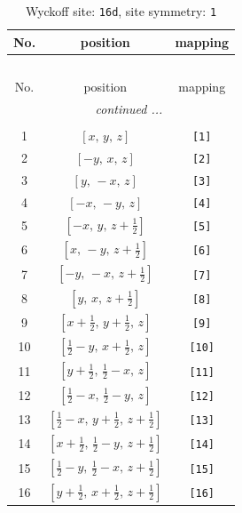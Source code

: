\documentclass[fleqn,8pt]{jsarticle}
\begin{document}
\begin{longtable}{ccc}
\caption{Wyckoff site: {\tt 16d}, site symmetry: {\tt 1}}
 \\
 \hline \hline
No. & position & mapping \\ \hline \endfirsthead

\multicolumn{2}{l}{\tablename\ \thetable{}} \\
 \hline \hline
No. & position & mapping \\ \hline \endhead

 \hline \hline
\multicolumn{2}{r}{\footnotesize\it continued ...} \\ \endfoot

 \hline \hline
\multicolumn{2}{r}{} \\ \endlastfoot

1 & $\left[ x,\, y,\, z \right]$ & {\tt [1]} \\ \hline
2 & $\left[ - y,\, x,\, z \right]$ & {\tt [2]} \\ \hline
3 & $\left[ y,\, - x,\, z \right]$ & {\tt [3]} \\ \hline
4 & $\left[ - x,\, - y,\, z \right]$ & {\tt [4]} \\ \hline
5 & $\left[ - x,\, y,\, z + \frac{1}{2} \right]$ & {\tt [5]} \\ \hline
6 & $\left[ x,\, - y,\, z + \frac{1}{2} \right]$ & {\tt [6]} \\ \hline
7 & $\left[ - y,\, - x,\, z + \frac{1}{2} \right]$ & {\tt [7]} \\ \hline
8 & $\left[ y,\, x,\, z + \frac{1}{2} \right]$ & {\tt [8]} \\ \hline
9 & $\left[ x + \frac{1}{2},\, y + \frac{1}{2},\, z \right]$ & {\tt [9]} \\ \hline
10 & $\left[ \frac{1}{2} - y,\, x + \frac{1}{2},\, z \right]$ & {\tt [10]} \\ \hline
11 & $\left[ y + \frac{1}{2},\, \frac{1}{2} - x,\, z \right]$ & {\tt [11]} \\ \hline
12 & $\left[ \frac{1}{2} - x,\, \frac{1}{2} - y,\, z \right]$ & {\tt [12]} \\ \hline
13 & $\left[ \frac{1}{2} - x,\, y + \frac{1}{2},\, z + \frac{1}{2} \right]$ & {\tt [13]} \\ \hline
14 & $\left[ x + \frac{1}{2},\, \frac{1}{2} - y,\, z + \frac{1}{2} \right]$ & {\tt [14]} \\ \hline
15 & $\left[ \frac{1}{2} - y,\, \frac{1}{2} - x,\, z + \frac{1}{2} \right]$ & {\tt [15]} \\ \hline
16 & $\left[ y + \frac{1}{2},\, x + \frac{1}{2},\, z + \frac{1}{2} \right]$ & {\tt [16]} \\
\end{longtable}
\end{document}
